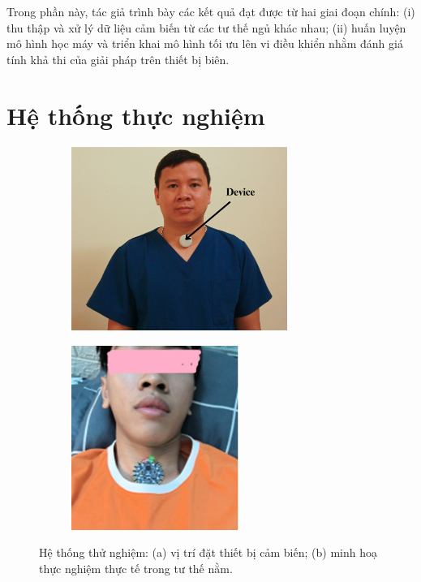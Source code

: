 Trong phần này, tác giả trình bày các kết quả đạt được từ hai giai đoạn chính: 
(i) thu thập và xử lý dữ liệu cảm biến từ các tư thế ngủ khác nhau; 
(ii) huấn luyện mô hình học máy và triển khai mô hình tối ưu lên vi điều khiển nhằm đánh giá tính khả thi của giải pháp trên thiết bị biên.

\section{Hệ thống thực nghiệm}

\begin{figure}[htbp]
    \centering
    \begin{subfigure}[b]{0.45\linewidth}
        \includegraphics[width=\linewidth,height=6cm,keepaspectratio]{images/sleepdive2.png}
        \caption{}
        \label{fig:device_position}
    \end{subfigure}
    \hfill
    \begin{subfigure}[b]{0.45\linewidth}
        \includegraphics[width=\linewidth,height=6cm,keepaspectratio]{images/thucnghiem.png}
        \caption{}
        \label{fig:practical_test}
    \end{subfigure}
    \caption{Hệ thống thử nghiệm: (a) vị trí đặt thiết bị cảm biến; (b) minh hoạ thực nghiệm thực tế trong tư thế nằm.}
    \label{fig:experiment_system}
\end{figure}

